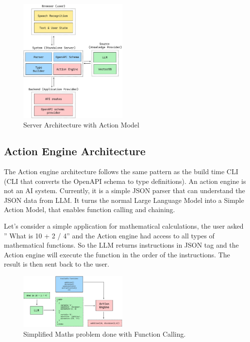 \documentclass[conference]{IEEEtran}
\begin{document}
\begin{figure}[htbp]
    \centering
    \includegraphics[width=0.48\textwidth]{images/server.png}
    \caption{Server Architecture with Action Model}
    \label{fig}
\end{figure}

\subsection{Action Engine Architecture}
The Action engine architecture follows the same pattern as the build time CLI
(CLI that converts the OpenAPI schema to type definitions). An action engine is
not an AI system. Currently, it is a simple JSON parser that can understand the
JSON data from LLM. It turns the normal Large Language Model into a Simple
Action Model, that enables function calling and chaining.

Let's consider a simple application for mathematical calculations, the user
asked ” What is 10 + 2 / 4” and the Action engine had access to all types of
mathematical functions. So the LLM returns instructions in JSON tag and the
Action engine will execute the function in the order of the instructions. The
result is then sent back to the user.

\begin{figure}[htbp]
    \centering
    \includegraphics[width=0.48\textwidth]{images/maths.png}
    \caption{Simplified Maths problem done with Function Calling.}
    \label{fig}
\end{figure}
\end{document}
